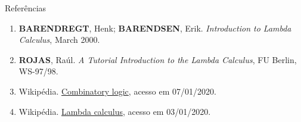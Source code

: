 \begin{frame}[fragile]{Referências}

    \begin{enumerate}
        \item \textbf{BARENDREGT}, Henk; \textbf{BARENDSEN}, Erik. \textit{Introduction to 
            Lambda Calculus}, March 2000.

        \item \textbf{ROJAS}, Raúl. \textit{A Tutorial Introduction to the Lambda Calculus},
            FU Berlin, WS-97/98.
  
        \item Wikipédia. \href{https://en.wikipedia.org/wiki/Combinatory_logic}{Combinatory logic},
            acesso em 07/01/2020.

        \item Wikipédia. \href{https://en.wikipedia.org/wiki/Lambda_calculus}{Lambda calculus},
            acesso em 03/01/2020. 

    \end{enumerate}

\end{frame}
